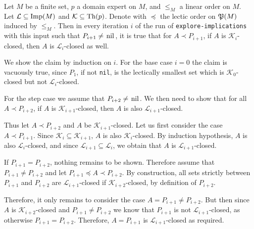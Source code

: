 \begin{Proposition}
  \label{prop:explore-implications-closedness-persists}
  Let $M$ be a finite set, $p$ a domain expert on $M$, and $\leq_M$ a linear order on
  $M$. Let $\mathcal{L} \subseteq \operatorname{Imp}(M)$ and $\mathcal{K} \subseteq \operatorname{Th}(p)$.  Denote
  with $\preceq$ the lectic order on ${\mathfrak{P}(M)}$ induced by $\leq_M$.  Then in every
  iteration $i$ of the run of \lstinline{explore-implications} with this input such that
  $P_{i+1} \neq \text{\lstinline{nil}}$, it is true that for $A \prec P_{i+1}$, if $A$ is
  $\mathcal{K}_i$-closed, then $A$ is $\mathcal{L}_i$-closed as well.
\end{Proposition}
\begin{Proof}
  We show the claim by induction on $i$.  For the base case $i = 0$ the claim is vacuously
  true, since $P_1$, if not \lstinline{nil}, is the lectically smallest set which is
  $\mathcal{K}_0$-closed but not $\mathcal{L}_i$-closed.

  For the step case we assume that $P_{i+2} \neq \text{\lstinline{nil}}$.  We then need to
  show that for all $A \prec P_{i+2}$, if $A$ is $\mathcal{K}_{i+1}$-closed, then $A$ is
  also $\mathcal{L}_{i+1}$-closed.

  Thus let $A \prec P_{i+2}$ and $A$ be $\mathcal{K}_{i+1}$-closed.  Let us first consider
  the case $A \prec P_{i+1}$.  Since $\mathcal{K}_i \subseteq \mathcal{K}_{i+1}$, $A$ is
  also $\mathcal{K}_i$-closed.  By induction hypothesis, $A$ is also
  $\mathcal{L}_i$-closed, and since $\mathcal{L}_{i+1} \subseteq \mathcal{L}_i$, we obtain
  that $A$ is $\mathcal{L}_{i+1}$-closed.

  If $P_{i+1} = P_{i+2}$, nothing remains to be shown.  Therefore assume that $P_{i+1}
  \neq P_{i+2}$ and let $P_{i+1} \preceq A \prec P_{i+2}$.  By construction, all sets
  strictly between $P_{i+1}$ and $P_{i+2}$ are $\mathcal{L}_{i+1}$-closed if
  $\mathcal{K}_{i+2}$-closed, by definition of $P_{i+2}$.

  Therefore, it only remains to consider the case $A = P_{i+1} \neq P_{i+2}$.  But then
  since $A$ is $\mathcal{K}_{i+2}$-closed and $P_{i+1} \neq P_{i+2}$ we know that
  $P_{i+1}$ is not $\mathcal{L}_{i+1}$-closed, as otherwise $P_{i+1} = P_{i+2}$.
  Therefore, $A = P_{i+1}$ is $\mathcal{L}_{i+1}$-closed as required.
\end{Proof}

